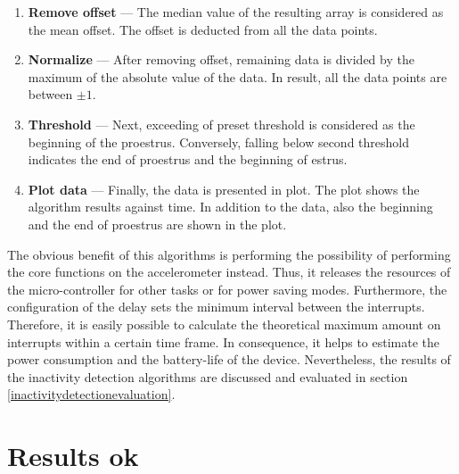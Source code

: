 \documentclass[english,12pt,a4paper,pdftex,elec,utf8]{aaltothesis}
\begin{document}
\begin{enumerate}
\item \textbf{Remove offset} --- The median value of the resulting array is considered as the mean offset. The offset is deducted from all the data points.

\item \textbf{Normalize} --- After removing offset, remaining data is divided by the maximum of the absolute value of the data. In result, all the data points are between $\pm 1$.

\item \textbf{Threshold} --- Next, exceeding of preset threshold is considered as the beginning of the proestrus. Conversely, falling below second threshold indicates the end of proestrus and the beginning of estrus.

\item \textbf{Plot data} --- Finally, the data is presented in plot. The plot shows the algorithm results against time. In addition to the data, also the beginning and the end of proestrus are shown in the plot.


\end{enumerate}

The obvious benefit of this algorithms is performing the possibility of performing the core functions on the accelerometer instead. Thus, it releases the resources of the micro-controller for other tasks or for power saving modes. Furthermore, the configuration of the delay sets the minimum interval between the interrupts. Therefore, it is easily possible to calculate the theoretical maximum amount on interrupts within a certain time frame. In consequence, it helps to estimate the power consumption and the battery-life of the device. Nevertheless, the results of the inactivity detection algorithms are discussed and evaluated in section \ref{inactivitydetectionevaluation}.


\clearpage
\section{Results ok} \label{resultssection}
\end{document}
